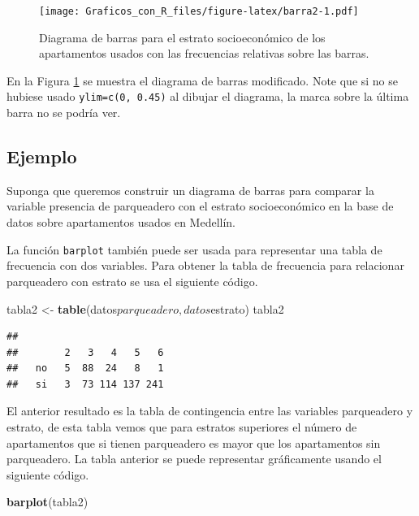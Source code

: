 \documentclass[10pt,]{krantz}
\makeatletter
\newenvironment{Shaded}{\begin{snugshade}}{\end{snugshade}}
\newcommand{\KeywordTok}[1]{\textcolor[rgb]{0.13,0.29,0.53}{\textbf{{#1}}}}
\newcommand{\StringTok}[1]{\textcolor[rgb]{0.31,0.60,0.02}{{#1}}}
\newcommand{\NormalTok}[1]{{#1}}
\newenvironment{kframe}{%
\medskip{}
\setlength{\fboxsep}{.8em}
 \def\at@end@of@kframe{}%
 \ifinner\ifhmode%
  \def\at@end@of@kframe{\end{minipage}}%
  \begin{minipage}{\columnwidth}%
 \fi\fi%
 \def\FrameCommand##1{\hskip\@totalleftmargin \hskip-\fboxsep
 \colorbox{shadecolor}{##1}\hskip-\fboxsep
     \hskip-\linewidth \hskip-\@totalleftmargin \hskip\columnwidth}%
 \MakeFramed {\advance\hsize-\width
   \@totalleftmargin\z@ \linewidth\hsize
   \@setminipage}}%
 {\par\unskip\endMakeFramed%
 \at@end@of@kframe}
\renewenvironment{Shaded}{\begin{kframe}}{\end{kframe}}
\makeatother
\begin{document}
\begin{figure}[htbp]
\centering
\texttt{[image: Graficos\_con\_R\_files/figure-latex/barra2-1.pdf]}
\caption{\label{fig:barra2}Diagrama de barras para el estrato socioeconómico
de los apartamentos usados con las frecuencias relativas sobre las
barras.}
\end{figure}

En la Figura \ref{fig:barra2} se muestra el diagrama de barras
modificado. Note que si no se hubiese usado \texttt{ylim=c(0,\ 0.45)} al
dibujar el diagrama, la marca sobre la última barra no se podría ver.

\subsection*{Ejemplo}\label{ejemplo-22}


Suponga que queremos construir un diagrama de barras para comparar la
variable presencia de parqueadero con el estrato socioeconómico en la
base de datos sobre apartamentos usados en Medellín.

La función \texttt{barplot} también puede ser usada para representar una
tabla de frecuencia con dos variables. Para obtener la tabla de
frecuencia para relacionar parqueadero con estrato se usa el siguiente
código.

\begin{Shaded}
\begin{Highlighting}[]
\NormalTok{tabla2 <-}\StringTok{ }\KeywordTok{table}\NormalTok{(datos$parqueadero, datos$estrato)}
\NormalTok{tabla2}
\end{Highlighting}
\end{Shaded}

\begin{verbatim}
##     
##        2   3   4   5   6
##   no   5  88  24   8   1
##   si   3  73 114 137 241
\end{verbatim}

El anterior resultado es la tabla de contingencia entre las variables
parqueadero y estrato, de esta tabla vemos que para estratos superiores
el número de apartamentos que si tienen parqueadero es mayor que los
apartamentos sin parqueadero. La tabla anterior se puede representar
gráficamente usando el siguiente código.

\begin{Shaded}
\begin{Highlighting}[]
\KeywordTok{barplot}\NormalTok{(tabla2)}
\end{Highlighting}
\end{Shaded}
\end{document}
